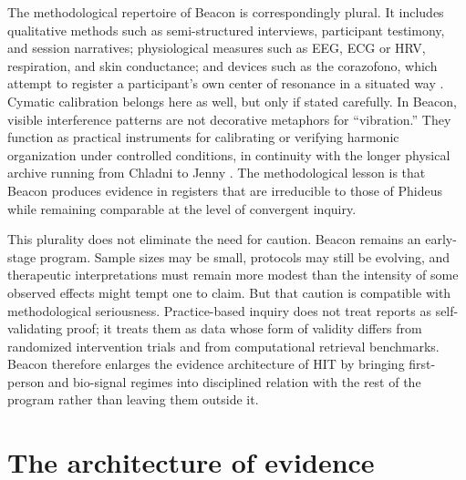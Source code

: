The methodological repertoire of Beacon is correspondingly plural. It includes qualitative methods such as semi-structured interviews, participant testimony, and session narratives; physiological measures such as EEG, ECG or HRV, respiration, and skin conductance; and devices such as the corazofono, which attempt to register a participant's own center of resonance in a situated way \parencite{porges_2011, porges_2017}. Cymatic calibration belongs here as well, but only if stated carefully. In Beacon, visible interference patterns are not decorative metaphors for \enquote{vibration.} They function as practical instruments for calibrating or verifying harmonic organization under controlled conditions, in continuity with the longer physical archive running from Chladni to Jenny \parencite{chladni_1787, jenny_1967}. The methodological lesson is that Beacon produces evidence in registers that are irreducible to those of Phideus while remaining comparable at the level of convergent inquiry.

This plurality does not eliminate the need for caution. Beacon remains an early-stage program. Sample sizes may be small, protocols may still be evolving, and therapeutic interpretations must remain more modest than the intensity of some observed effects might tempt one to claim. But that caution is compatible with methodological seriousness. Practice-based inquiry does not treat reports as self-validating proof; it treats them as data whose form of validity differs from randomized intervention trials and from computational retrieval benchmarks. Beacon therefore enlarges the evidence architecture of HIT by bringing first-person and bio-signal regimes into disciplined relation with the rest of the program rather than leaving them outside it.

\section{The architecture of evidence}

